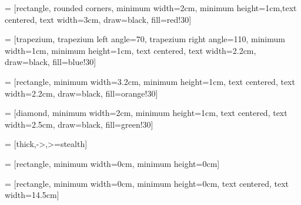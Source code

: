 %
%
%
%
% 



\usepackage{tikz}
\usetikzlibrary{shapes.geometric, arrows}

 = [rectangle, rounded corners, minimum width=2cm, minimum height=1cm,text centered, text width=3cm, draw=black, fill=red!30] 

 = [trapezium, trapezium left angle=70, trapezium right angle=110, minimum width=1cm, minimum height=1cm, text centered, text width=2.2cm, draw=black, fill=blue!30]

 = [rectangle, minimum width=3.2cm, minimum height=1cm, text centered, text width=2.2cm, draw=black, fill=orange!30]

 = [diamond, minimum width=2cm, minimum height=1cm, text centered, text width=2.5cm, draw=black, fill=green!30]

 = [thick,->,>=stealth]

 = [rectangle, minimum width=0cm, minimum height=0cm]

 = [rectangle, minimum width=0cm, minimum height=0cm, text centered, text width=14.5cm]



\frontmatter
\pagestyle{empty} %



\pagestyle{fancy} %
\tableofcontents


